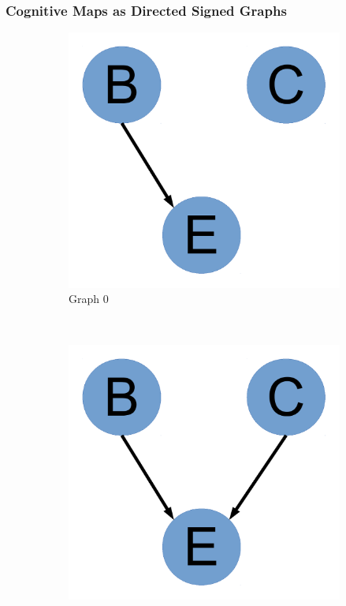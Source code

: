 \documentclass{beamer}
\begin{document}
\begin{frame}
\frametitle{Cognitive Maps as Directed Signed Graphs}
\begin{figure}
        \centering
        \begin{subfigure}[b]{0.3\textwidth}
                \includegraphics[width=\textwidth]{Graph0.pdf}
                \caption{Graph 0}
                \label{fig:gull}
        \end{subfigure}%
        ~ %
        \begin{subfigure}[b]{0.3\textwidth}
                \includegraphics[width=\textwidth]{Graph1.pdf}

\end{subfigure}
\end{figure}
\end{frame}
\end{document}

